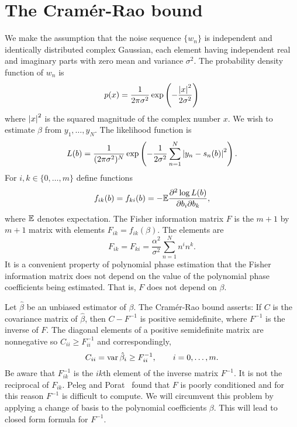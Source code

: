 \documentclass[journal,10pt]{IEEEtran}
\begin{document}
\section{The Cram\'{e}r-Rao bound} \label{sec_crb}

We make the assumption that the noise sequence $\{ w_n \}$ is independent and identically distributed complex Gaussian, each element having independent real and imaginary parts with zero mean and variance $\sigma^2$.  The probability density function of $w_n$ is 
\[
p(x) = \frac{1}{2 \pi \sigma^2} \exp\left( -\frac{{\left| x \right|}^2}{2\sigma^2} \right)
\]
where ${\left| x \right|}^2$ is the squared magnitude of the complex number $x$.  We wish to estimate $\beta$ from $y_1, \dots, y_N$.  The likelihood function is
\[
L(b) = \frac{1}{(2 \pi \sigma^2)^N} \exp\left( - \frac{1}{2\sigma^{2}} \sum_{n=1}^N {\left| y_n -  s_n(b)  \right|}^2 \right).
\]
For $i,k \in \{0, \dots, m\}$ define functions 
\[
f_{ik}(b) = f_{ki}(b) = -{\mathbb E} \frac{ \partial^2 \log L(b) }{ \partial b_{i} \partial b_{k}},
\]  
where ${\mathbb E}$ denotes expectation.  The Fisher information matrix $F$ is the $m+1$ by $m+1$ matrix with elements $F_{i k} = f_{ik}(\beta)$.  The elements are
\[
F_{ik} = F_{ki} = \frac{\alpha^2}{\sigma^2}\sum_{n=1}^{N} n^{i}n^{k}.
\]
It is a convenient property of polynomial phase estimation that the Fisher information matrix does not depend on the value of the polynomial phase coefficients being estimated.  That is, $F$ does not depend on $\beta$.

Let $\hat{\beta}$ be an unbiased estimator of $\beta$.  The Cram\'{e}r-Rao bound asserts:  If $C$ is the covariance matrix of $\hat{\beta}$, then $C - F^{-1}$ is positive semidefinite, where $F^{-1}$ is the inverse of $F$.  The diagonal elements of a positive semidefinite matrix are nonnegative so $C_{ii} \geq F^{-1}_{ii}$ and correspondingly, 
\[
C_{ii} = \operatorname{var} \hat{\beta}_{i} \geq F_{ii}^{-1}, \qquad i=0,\dots,m.
\]  
Be aware that $F_{ik}^{-1}$ is the $ik$th element of the inverse matrix $F^{-1}$.  It is not the reciprocal of $F_{ik}$.  Peleg and Porat~\cite{Peleg1991_CRB_PPS_1991} found that $F$ is poorly conditioned and for this reason $F^{-1}$ is difficult to compute.   We will circumvent this problem by applying a change of basis to the polynomial coefficients $\beta$.  This will lead to closed form formula for $F^{-1}$.  
\end{document}
